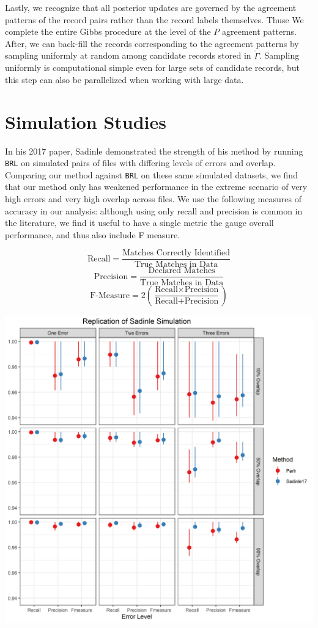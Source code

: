 \documentclass[
  12pt,
]{article}
\begin{document}
Lastly, we recognize that all posterior updates are governed by the
agreement patterns of the record pairs rather than the record labels
themselves. Thuse We complete the entire Gibbs procedure at the level of
the \(P\) agreement patterns. After, we can back-fill the records
corresponding to the agreement patterns by sampling uniformly at random
among candidate records stored in \(\tilde{\Gamma}\). Sampling uniformly
is computational simple even for large sets of candidate records, but
this step can also be parallelized when working with large data.

\hypertarget{simulation-studies}{%
\section{Simulation Studies}\label{simulation-studies}}

In his 2017 paper, Sadinle demonstrated the strength of his method by
running \texttt{BRL} on simulated pairs of files with differing levels
of errors and overlap. Comparing our method against \texttt{BRL} on
these same simulated datasets, we find that our method only has weakened
performance in the extreme scenario of very high errors and very high
overlap across files. We use the following measures of accuracy in our
analysis: although using only recall and precision is common in the
literature, we find it useful to have a single metric the gauge overall
performance, and thus also include F measure.

\[\text{Recall} = \frac{\text{Matches Correctly Identified}}{\text{True Matches in Data}}\]
\[\text{Precision} = \frac{\text{Declared Matches}}{\text{True Matches in Data}}\]
\[\text{F-Measure} = 2\left(\frac{\text{Recall} \times \text{Precision}}{\text{Recall} + \text{Precision}}\right)\]

\begin{center}\includegraphics[width=29.17in]{../notes/figures/sadinle_sim_plot} \end{center}
\end{document}
